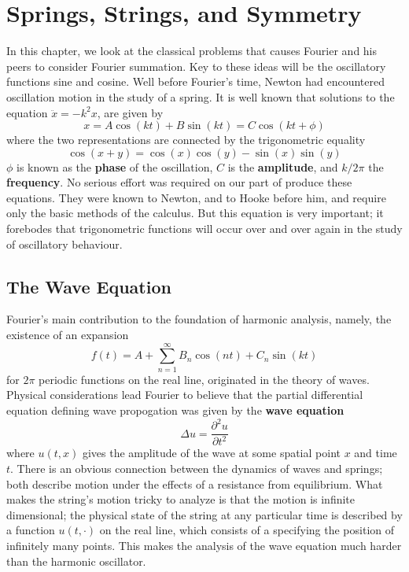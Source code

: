 \chapter{Springs, Strings, and Symmetry}

In this chapter, we look at the classical problems that causes Fourier and his peers to consider Fourier summation. Key to these ideas will be the oscillatory functions sine and cosine. Well before Fourier's time, Newton had encountered oscillation motion in the study of a spring. It is well known that solutions to the equation $\ddot{x} = -k^2x$, are given by
%
\[ x = A \cos(kt) + B \sin(kt) = C \cos(kt + \phi) \]
%
where the two representations are connected by the trigonometric equality
%
\[ \cos(x + y) = \cos(x) \cos(y) - \sin(x) \sin(y) \]
%
$\phi$ is known as the {\bf phase} of the oscillation, $C$ is the {\bf amplitude}, and $k/2\pi$ the {\bf frequency}. No serious effort was required on our part of produce these equations. They were known to Newton, and to Hooke before him, and require only the basic methods of the calculus. But this equation is very important; it forebodes that trigonometric functions will occur over and over again in the study of oscillatory behaviour.

\section{The Wave Equation}

Fourier's main contribution to the foundation of harmonic analysis, namely, the existence of an expansion
%
\[ f(t) = A + \sum_{n = 1}^\infty B_n \cos(nt) + C_n \sin(kt) \]
%
for $2\pi$ periodic functions on the real line, originated in the theory of waves. Physical considerations lead Fourier to believe that the partial differential equation defining wave propogation was given by the {\bf wave equation}
%
\[ \Delta u = \frac{\partial^2 u}{\partial t^2} \]
%
where $u(t,x)$ gives the amplitude of the wave at some spatial point $x$ and time $t$. There is an obvious connection between the dynamics of waves and springs; both describe motion under the effects of a resistance from equilibrium. What makes the string's motion tricky to analyze is that the motion is infinite dimensional; the physical state of the string at any particular time is described by a function $u(t,\cdot)$ on the real line, which consists of a specifying the position of infinitely many points. This makes the analysis of the wave equation much harder than the harmonic oscillator.


